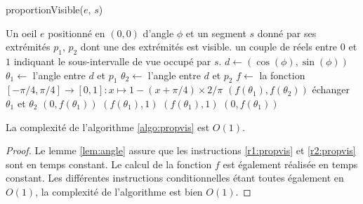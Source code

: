 \begin{algorithm}
  \caption{proportionVisible($e$, $s$)}
  \begin{algorithmic}[1] \label{algo:propvis}
    \REQUIRE Un oeil $e$ positionné en $(0, 0)$ d'angle $\phi$ et un segment $s$
    donné par ses extrémités $p_1$, $p_2$ dont une des extrémités est visible.
    \ENSURE un couple de réels entre $0$ et $1$  indiquant le sous-intervalle
    de vue occupé par $s$.
    \STATE $d\leftarrow (\cos(\phi), \sin(\phi))$
    \STATE $\theta_1\leftarrow$ l'angle entre $d$ et $p_1$ \label{r1:propvis}
    \STATE $\theta_2\leftarrow$ l'angle entre $d$ et $p_2$ \label{r2:propvis}
    \STATE $f\leftarrow$ la fonction $
    [-\pi/4, \pi/4]\to [0, 1]: x\mapsto 1 - (x+\pi/4) \times 2/\pi$
    \IF{$\theta_1\in[-\pi/4, \pi/4]\land \theta_2\in[-\pi/4, \pi/4]$}
    \RETURN $(f(\theta_1), f(\theta_2))$
    \ELSE
    \IF{$\theta_1\notin[-\pi/4, \pi/4]$}
    \STATE échanger $\theta_1$ et $\theta_2$
    \ENDIF
    \RETURN $(0, f(\theta_1))$
    \ELSE
    \RETURN $(f(\theta_1), 1)$
    \ENDIF
    \RETURN $(f(\theta_1), 1)$
    \ELSE
    \RETURN $(0, f(\theta_1))$
    \ENDIF
    \ENDIF
    \ENDIF
  \end{algorithmic}
\end{algorithm}

\begin{prop}
  La complexité de l'algorithme \ref{algo:propvis} est $O(1)$.
\end{prop}
\begin{proof}
  Le lemme \ref{lem:angle} assure que les instructions \ref{r1:propvis} et
  \ref{r2:propvis} sont en temps constant. Le calcul de la fonction $f$
  est également réalisée en temps constant. Les différentes instructions
  conditionnelles étant toutes également en $O(1)$, la complexité de
  l'algorithme est bien $O(1)$.
\end{proof}



